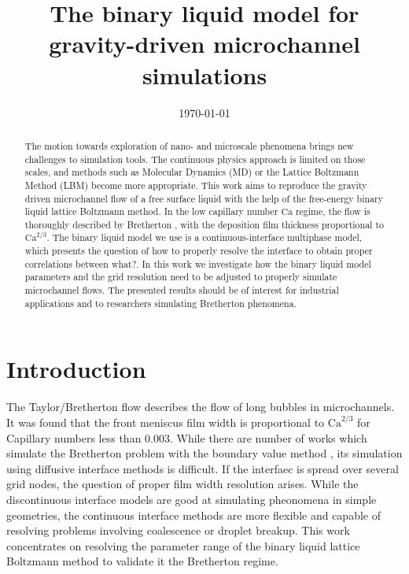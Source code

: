 \documentclass{article}
\title{The binary liquid model for gravity-driven microchannel simulations}
\date{\today}
\newcommand{\Ca}{\mathrm{Ca}}
\newcommand{\todo}[1]{{\color{red}#1}}
\begin{document}
\maketitle

\begin{abstract}
The motion towards exploration of nano- and microscale phenomena brings new
challenges to simulation tools. The continuous physics approach is limited on
those scales, and methods such as Molecular Dynamics (MD) or the Lattice
Boltzmann Method (LBM) become more appropriate. This work aims to
reproduce the gravity driven microchannel flow of a free surface liquid with the
help of the free-energy binary liquid lattice Boltzmann method. In the low capillary number
$\Ca$ regime, the flow is thoroughly described by Bretherton \cite{bretherton},
with the deposition film thickness proportional to $\Ca^{2/3}$. The binary
liquid model we use is a continuous-interface multiphase model, which presents
the question of how to properly resolve the interface to obtain proper correlations \todo{between what?}.
In this work we investigate how the binary liquid model parameters and the grid resolution
need to be adjusted to properly simulate microchannel flows.  The presented results
should be of interest for industrial applications and to researchers simulating
Bretherton phenomena.
\end{abstract}


\section{Introduction}
The Taylor/Bretherton \cite{bretherton} flow describes the flow of long bubbles in
microchannels. It was found that the front meniscus film width is proportional
to $\Ca^{2/3}$ for Capillary numbers less than $0.003$. While there are number
of works which simulate the Bretherton problem with the boundary value method
\cite{ingham-plates,heil-bretherton}, its simulation using diffusive interface methods
is difficult.  If the interfaec is spread over several grid nodes, the question of
proper film width resolution arises. While the discontinuous interface models
are good at simulating pheonomena in simple geometries, the continuous interface
methods are more flexible and capable of resolving problems involving coalescence
or droplet breakup. This work
concentrates on resolving the parameter range of the binary liquid lattice
Boltzmann method to validate it the Bretherton regime.
\end{document}
